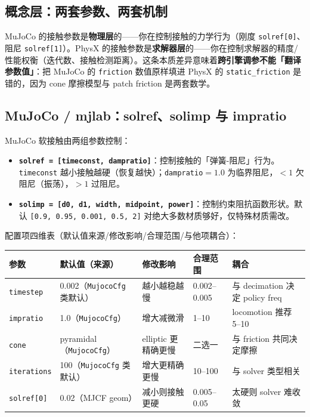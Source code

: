 \subsection{概念层：两套参数、两套机制}

\begin{insight}\label{ins:rlmc-phys-twoparams}
MuJoCo 的接触参数是\textbf{物理层}的——你在控制接触的力学行为（刚度 \verb|solref[0]|、阻尼 \verb|solref[1]|）。PhysX 的接触参数是\textbf{求解器层}的——你在控制求解器的精度/性能权衡（迭代数、接触检测距离）。这条本质差异意味着\textbf{跨引擎调参不能「翻译参数值」}：把 MuJoCo 的 \verb|friction| 数值原样填进 PhysX 的 \verb|static_friction| 是错的，因为 cone 摩擦模型与 patch friction 是两套数学。
\end{insight}

\subsection{MuJoCo / mjlab：solref、solimp 与 impratio}

MuJoCo 软接触由两组参数控制：

\begin{itemize}
  \item \textbf{\texttt{solref = [timeconst, dampratio]}}：控制接触的「弹簧-阻尼」行为。\verb|timeconst| 越小接触越硬（恢复越快）；\verb|dampratio|$=1.0$ 为临界阻尼，$<1$ 欠阻尼（振荡），$>1$ 过阻尼。
  \item \textbf{\texttt{solimp = [d0, d1, width, midpoint, power]}}：控制约束阻抗函数形状。默认 \verb|[0.9, 0.95, 0.001, 0.5, 2]| 对绝大多数材质够好，仅特殊材质需改。
\end{itemize}

配置项四维表（默认值来源/修改影响/合理范围/与他项耦合）：

\begin{center}
\small
\begin{tabular}{@{}lp{2.4cm}p{2.8cm}p{2.2cm}p{2.6cm}@{}}
\toprule
参数 & 默认值（来源） & 修改影响 & 合理范围 & 耦合 \\
\midrule
\verb|timestep| & 0.002（\verb|MujocoCfg| 类默认） & 越小越稳越慢 & 0.002--0.005 & 与 decimation 决定 policy freq \\
\verb|impratio| & 1.0（\verb|MujocoCfg|） & 增大减微滑 & 1--10 & locomotion 推荐 5--10 \\
\verb|cone| & pyramidal（\verb|MujocoCfg|） & elliptic 更精确更慢 & 二选一 & 与 friction 共同决定摩擦 \\
\verb|iterations| & 100（\verb|MujocoCfg| 类默认） & 增大更精确更慢 & 10--100 & 与 solver 类型相关 \\
\verb|solref[0]| & 0.02（MJCF geom） & 减小则接触更硬 & 0.005--0.05 & 太硬则 solver 难收敛 \\
\bottomrule
\end{tabular}
\end{center}


